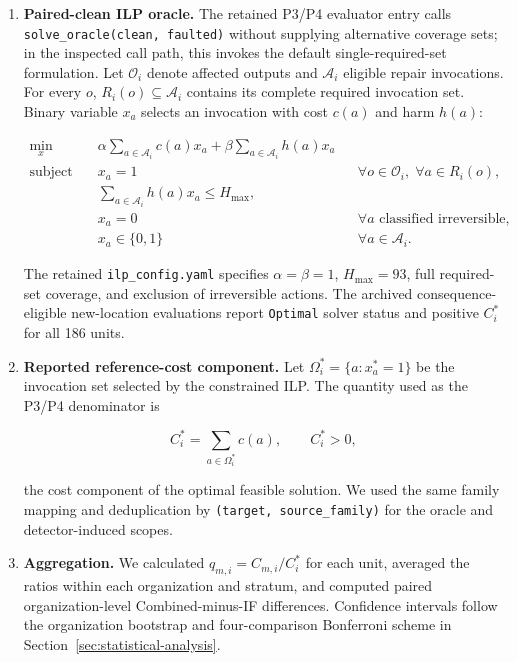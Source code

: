 \documentclass[sn-basic]{sn-jnl}%
\theoremstyle{thmstyleone}%
\theoremstyle{thmstyletwo}%
\theoremstyle{thmstylethree}%
\begin{document}
\begin{appendices}
\begin{enumerate}
\[
C_{m,i}=\sum_{(h,f)\in\Psi_i(A_{m,i})}w(f).
\]

\item \textbf{Paired-clean ILP oracle.} The retained P3/P4 evaluator entry calls \texttt{solve\_oracle(clean, faulted)} without supplying alternative coverage sets; in the inspected call path, this invokes the default single-required-set formulation. Let \(\mathcal{O}_i\) denote affected outputs and \(\mathcal{A}_i\) eligible repair invocations. For every \(o\), \(R_i(o)\subseteq\mathcal{A}_i\) contains its complete required invocation set. Binary variable \(x_a\) selects an invocation with cost \(c(a)\) and harm \(h(a)\):

\[
\begin{aligned}
\min_{x}\quad &
   \alpha\sum_{a\in\mathcal{A}_i} c(a)x_a
   + \beta\sum_{a\in\mathcal{A}_i} h(a)x_a \\
\text{subject to}\quad &
   x_a=1 && \forall o\in\mathcal{O}_i,\; \forall a\in R_i(o), \\
& \sum_{a\in\mathcal{A}_i} h(a)x_a \le H_{\max}, \\
& x_a=0 && \forall a\text{ classified irreversible}, \\
& x_a\in\{0,1\} && \forall a\in\mathcal{A}_i.
\end{aligned}
\]

The retained \texttt{ilp\_config.yaml} specifies \(\alpha=\beta=1\), \(H_{\max}=93\), full required-set coverage, and exclusion of irreversible actions. The archived consequence-eligible new-location evaluations report \texttt{Optimal} solver status and positive \(C_i^{*}\) for all 186 units.

\item \textbf{Reported reference-cost component.} Let \(\Omega_i^{*}=\{a:x_a^{*}=1\}\) be the invocation set selected by the constrained ILP. The quantity used as the P3/P4 denominator is

\[
C_i^{*}=\sum_{a\in\Omega_i^{*}}c(a),\qquad C_i^{*}>0,
\]

the cost component of the optimal feasible solution. We used the same family mapping and deduplication by \texttt{(target, source\_family)} for the oracle and detector-induced scopes.

\item \textbf{Aggregation.} We calculated \(q_{m,i}=C_{m,i}/C_i^{*}\) for each unit, averaged the ratios within each organization and stratum, and computed paired organization-level Combined-minus-IF differences. Confidence intervals follow the organization bootstrap and four-comparison Bonferroni scheme in Section~\ref{sec:statistical-analysis}.


\end{enumerate}
\end{appendices}
\end{document}
